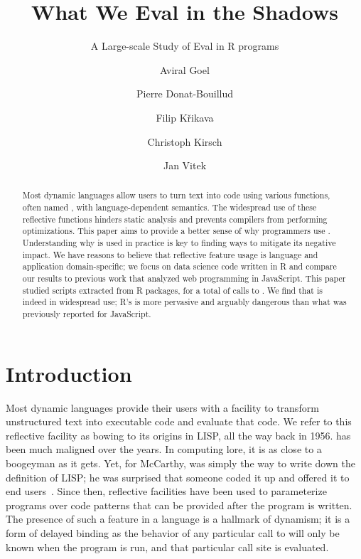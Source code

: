 \documentclass[screen,acmsmall]{acmart}%
\begin{document}
\title{What We Eval in the Shadows}
\subtitle{A Large-scale Study of Eval in R programs}

\author{Aviral Goel}
\author{Pierre Donat-Bouillud}
\author{Filip Křikava}
\author{Christoph Kirsch}
\author{Jan Vitek}

\begin{abstract}
 Most dynamic languages allow users to turn text into code using
  various functions, often named \eval, with language-dependent semantics. The
  widespread use of these reflective functions hinders static analysis and
  prevents compilers from performing optimizations. This paper aims to provide a
  better sense of why programmers use \eval. Understanding why \eval is used in
  practice is key to finding ways to mitigate its negative impact. We have
  reasons to believe that reflective feature usage is language and application
  domain-specific; we focus on data science code written in R and compare our
  results to previous work that analyzed web programming in JavaScript. This
  paper studied \CranRunnableScripts scripts extracted from \CranPackages R
  packages, for a total of \packageAllcalls calls to \eval. We find that \eval
  is indeed in widespread use; R's \eval is more pervasive and arguably
  dangerous than what was previously reported for JavaScript.
\end{abstract}

\maketitle
\renewcommand{\shortauthors}{Goel et al.}
\renewcommand{\shorttitle}{What We Eval in the Shadows}

\section{Introduction}

Most dynamic languages provide their users with a facility to transform
unstructured text into executable code and evaluate that code. We refer to this
reflective facility as \eval bowing to its origins in LISP, all the way back in
1956. \Eval has been much maligned over the years. In computing lore, it is as
close to a boogeyman as it gets. Yet, for McCarthy, \eval was simply the way to
write down the definition of LISP; he was surprised that someone coded it up and
offered it to end users~\cite{lisp}. Since then, reflective facilities have been
used to parameterize programs over code patterns that can be provided after the
program is written. The presence of such a feature in a language is a hallmark
of dynamism; it is a form of delayed binding as the behavior of any particular
call to \eval will only be known when the program is run, and that particular
call site is evaluated.
\end{document}

